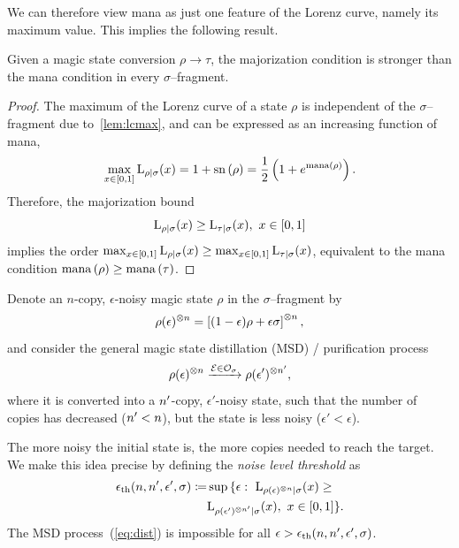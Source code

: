 \documentclass[pra,
aps,
twocolumn,
superscriptaddress,
groupedaddress,
nofootinbib,
reprint
]{revtex4-1}
\begin{document}
We can therefore view mana as just one feature of the Lorenz curve, namely its maximum value. 
This implies the following result.
\begin{theorem}\label{thm:bounds}
    Given a magic state conversion $\rho \longrightarrow \tau$, the majorization condition is stronger than the mana condition in every $\sigma$--fragment.
\end{theorem}
\begin{proof}
    The maximum of the Lorenz curve of a state $\rho$ is independent of the $\sigma$--fragment due to~\cref{lem:lcmax}, and can be expressed as an increasing function of mana,
    \begin{equation}
        \max_{x\in[0,1]}{\lc{\rho}{\sigma}(x)} = 1 + \sn{\rho} = \frac{1}{2} \left( 1 + e^\mana{\rho} \right).
    \end{equation}
    Therefore, the majorization bound
    \begin{equation}
    	\lc{\rho}{\sigma}(x) \geq \lc{\tau}{\sigma}(x),\ x\in[0,1]
    \end{equation}
    implies the order $\max_{x\in[0,1]}{\lc{\rho}{\sigma}(x)} \geq \max_{x\in[0,1]}{\lc{\tau}{\sigma}(x)}$, equivalent to the mana condition $\mana{\rho} \geq \mana{\tau}$.
\end{proof}

Denote an $n$-copy, $\epsilon$-noisy magic state $\rho$ in the $\sigma$--fragment by
\begin{equation}\label{eq:dist}
    \rho(\epsilon)\too{n} = \left[ (1 - \epsilon) \rho + \epsilon \sigma \right]\too{n},
\end{equation}
and consider the general magic state distillation (MSD) / purification process
\begin{equation}
		\rho(\epsilon)\too{n} \xrightarrow{\E \in \O_\sigma} \rho(\epsilon')\too{\tt},
\end{equation}
where it is converted into a $\tt$-copy, $\epsilon'$-noisy state, such that the number of copies has decreased ($\tt < n$), but the state is less noisy ($\epsilon' < \epsilon$).

The more noisy the initial state is, the more copies needed to reach the target. 
We make this idea precise by defining the \emph{noise level threshold} as
\begin{equation}\label{eq:ethresh}
	\begin{split}
	\epsilon_{\rm{th}}(n, \tt, \epsilon', \sigma) \coloneqq &\sup{\{\epsilon:\ \lc{\rho(\epsilon)\too{n}}{\sigma}}(x) \geq \\
	&{\lc{\rho(\epsilon')\too{\tt}}{\sigma}(x),\ x\in[0,1]\}}.
	\end{split}
\end{equation}
The MSD process~(\ref{eq:dist}) is impossible for all $\epsilon > \epsilon_{\rm{th}}(n, \tt, \epsilon', \sigma)$.
\end{document}
